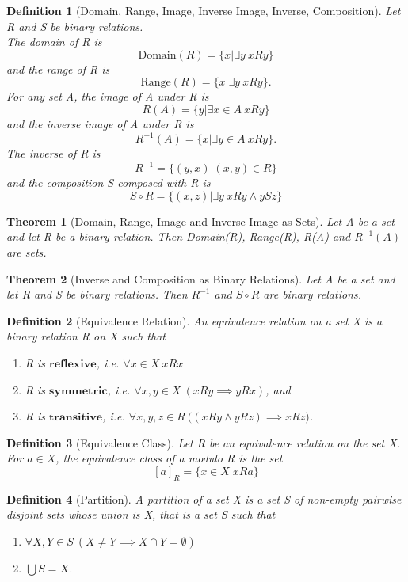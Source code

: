 \documentclass[11pt, oneside]{book}
\theoremstyle{break}
\newtheorem{thm}{Theorem}[section]
\newtheorem{defn}{Definition}[section]
\begin{document}
\begin{defn}[Domain, Range, Image, Inverse Image, Inverse, Composition]
	Let R and S be binary relations. \\
	The domain of R is
	\[
		\text{Domain}(R) = \{x | \exists y \> xRy\}
	\]
	and the range of R is
	\[
		\text{Range}(R) = \{x | \exists y \> xRy\}.
	\]
	For any set A, the image of A under R is
	\[
		R(A) = \{y | \exists x \in A \> xRy\}
	\]
	and the inverse image of A under R is
	\[
		R^{-1}(A) = \{x | \exists y \in A \> xRy\}.
	\]
	The inverse of R is
	\[
		R^{-1} = \{(y, x) | (x, y) \in R\}
	\]
	and the composition S composed with R is
	\[
		S \circ R = \{(x, z) | \exists y \> xRy \land ySz \}
	\]
\end{defn}

\begin{thm}[Domain, Range, Image and Inverse Image as Sets]
	Let A be a set and let R be a binary relation. Then Domain(R), Range(R), R(A) and $R^{-1}(A)$ are sets.
\end{thm}

\begin{thm}[Inverse and Composition as Binary Relations]
	Let A be a set and let R and S be binary relations. Then $R^{-1}$ and $S \circ R$ are binary relations.
\end{thm}

\begin{defn}[Equivalence Relation]
	An equivalence relation on a set X is a binary relation R on X such that
	\begin{enumerate}
		\item R is $\textbf{reflexive}$, i.e. $\forall x \in X \> xRx$
		\item R is $\textbf{symmetric}$, i.e. $\forall x, y \in X \> (xRy \implies yRx)$, and
		\item R is $\textbf{transitive}$, i.e. $\forall x, y, z \in R \> \big( (xRy \land yRz) \implies xRz \big)$.
	\end{enumerate}
\end{defn}

\begin{defn}[Equivalence Class]
	Let R be an equivalence relation on the set X. For $a \in X$, the equivalence class of a modulo R is the set
	\[
		[a]_R = \{x \in X | xRa \}
	\]
\end{defn}

\begin{defn}[Partition]
	A partition of a set X is a set S of non-empty pairwise disjoint sets whose union is X, that is a set S such that
	\begin{enumerate}
		\item $\forall X, Y \in S \> (X \neq Y \implies X \cap Y = \emptyset)$
		\item $\bigcup S = X$.
	\end{enumerate}
\end{defn}
\end{document}
